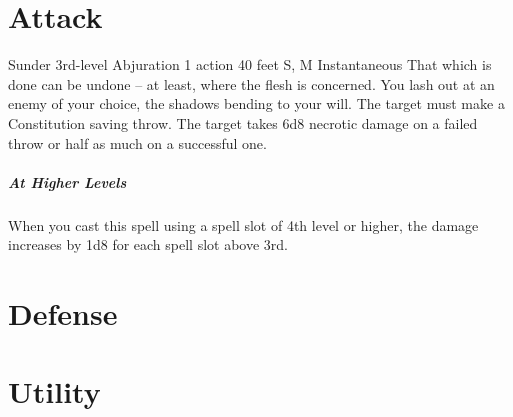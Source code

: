 \documentclass[./main.tex]{subfiles}
\begin{document}
\chapter{Attack}
\begin{spell}
	{Sunder}
	{3rd-level Abjuration}
	{1 action}
	{40 feet}
	{S, M}
	{Instantaneous}
	That which is done can be undone -- at least, where the flesh is concerned. You lash out at an enemy of your choice, the shadows bending to your will. The target must make a Constitution saving throw. The target takes 6d8 necrotic damage on a failed throw or half as much on a successful one.
	\paragraph{At Higher Levels} When you cast this spell using a spell slot of 4th level or higher, the damage increases by 1d8 for each spell slot above 3rd.
\end{spell}

\chapter{Defense}

\chapter{Utility}
\end{document}
